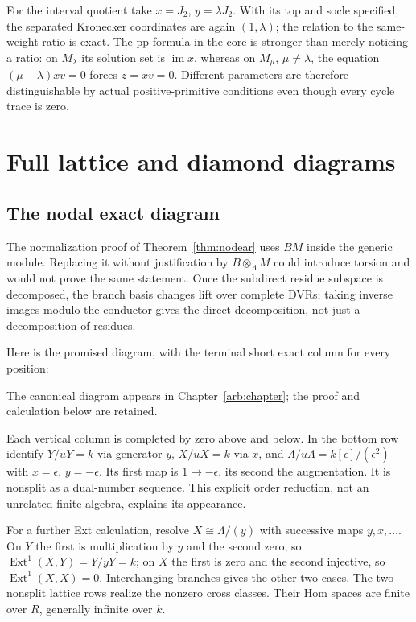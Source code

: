 For the interval quotient take $x=J_2$, $y=\lambda J_2$. With its top and socle specified, the separated Kronecker coordinates are again $(1,\lambda)$; the relation to the same-weight ratio is exact. The pp formula in the core is stronger than merely noticing a ratio: on $M_\lambda$ its solution set is $\operatorname{im}x$, whereas on $M_\mu$, $\mu\ne\lambda$, the equation $(\mu-\lambda)xv=0$ forces $z=xv=0$. Different parameters are therefore distinguishable by actual positive-primitive conditions even though every cycle trace is zero.


\chapter{Full lattice and diamond diagrams}
\section{The nodal exact diagram}
The normalization proof of Theorem~\ref{thm:nodear} uses $BM$ inside the generic module. Replacing it without justification by $B\otimes_\Lambda M$ could introduce torsion and would not prove the same statement. Once the subdirect residue subspace is decomposed, the branch basis changes lift over complete DVRs; taking inverse images modulo the conductor gives the direct decomposition, not just a decomposition of residues.

Here is the promised diagram, with the terminal short exact column for every position:
\par\noindent The canonical diagram appears in Chapter~\ref{arb:chapter}; the proof and calculation below are retained.\par
Each vertical column is completed by zero above and below. In the bottom row identify $Y/uY=k$ via generator $y$, $X/uX=k$ via $x$, and $\Lambda/u\Lambda=k[\epsilon]/(\epsilon^2)$ with $x=\epsilon$, $y=-\epsilon$. Its first map is $1\mapsto-\epsilon$, its second the augmentation. It is nonsplit as a dual-number sequence. This explicit order reduction, not an unrelated finite algebra, explains its appearance.

For a further Ext calculation, resolve $X\cong\Lambda/(y)$ with successive maps $y,x,\ldots$. On $Y$ the first is multiplication by $y$ and the second zero, so $\operatorname{Ext}^1(X,Y)=Y/yY=k$; on $X$ the first is zero and the second injective, so $\operatorname{Ext}^1(X,X)=0$. Interchanging branches gives the other two cases. The two nonsplit lattice rows realize the nonzero cross classes. Their Hom spaces are finite over $R$, generally infinite over $k$.

